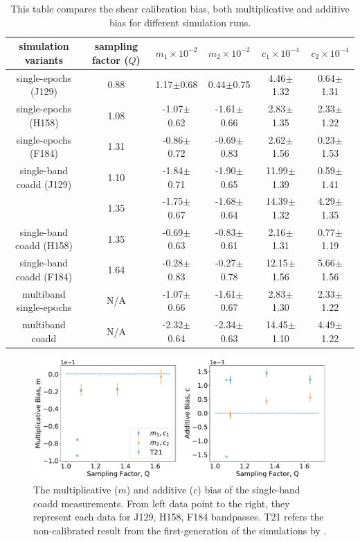 \documentclass[fleqn,usenatbib]{mnras}
\begin{document}
\begin{table}
	\centering
	\label{tab:bias_summary}
	\begin{tabular}[width=\textwidth]{ c|c|c|c|c|c } 
		\hline
		simulation variants & sampling factor ($Q$) & $m_{1}\times10^{-2}$ & $m_{2}\times10^{-2}$ & $c_{1}\times10^{-4}$ & $c_{2}\times10^{-4}$\\
		\hline
		single-epochs (J129) & 0.88 & 1.17$\pm$0.68 & 0.44$\pm$0.75 & 4.46$\pm$1.32 & 0.64$\pm$1.31\\
		single-epochs (H158) & 1.08 & -1.07$\pm$0.62 & -1.61$\pm$0.66 & 2.83$\pm$1.35 & 2.33$\pm$1.22\\
		single-epochs (F184) & 1.31 & -0.86$\pm$0.72 & -0.69$\pm$0.83 & 2.62$\pm$1.56 & 0.23$\pm$1.53\\
		\hline
		single-band coadd (J129) & 1.10 & -1.84$\pm$0.71 & -1.90$\pm$0.65 & 11.99$\pm$1.39 & 0.59$\pm$1.41\\
		\textcolor{red}{single-band coadd (H158) with oversampled PSF & 1.35 & -1.75$\pm$0.67 & -1.68$\pm$0.64 & 14.39$\pm$1.32 & 4.29$\pm$1.35}\\
		single-band coadd (H158) & 1.35 & -0.69$\pm$0.63 & -0.83$\pm$0.61 & 2.16$\pm$1.31 & 0.77$\pm$1.19\\
		single-band coadd (F184) & 1.64 & -0.28$\pm$0.83 & -0.27$\pm$0.78 & 12.15$\pm$1.56 & 5.66$\pm$1.56\\
		\hline
		multiband single-epochs & N/A & -1.07$\pm$0.66 & -1.61$\pm$0.67 & 2.83$\pm$1.30 & 2.33$\pm$1.22 \\
		multiband coadd & N/A & -2.32$\pm$0.64 & -2.34$\pm$0.63 & 14.45$\pm$1.10 & 4.49$\pm$1.22\\
		
		\hline
	\end{tabular}
	\caption{This table compares the shear calibration bias, both multiplicative and additive bias for different simulation runs.}
	\label{tab:result}
\end{table}

\begin{figure}
	\includegraphics[width=\textwidth]{final_result_v2.pdf}
    \caption{The multiplicative ($m$) and additive ($c$) bias of the single-band coadd measurements. From left data point to the right, they represent each data for J129, H158, F184 bandpasses. T21 refers the non-calibrated result from the first-generation of the simulations by \cite{2021MNRAS.501.2044T}. }
    \label{fig:final_result}
\end{figure}
\end{document}
